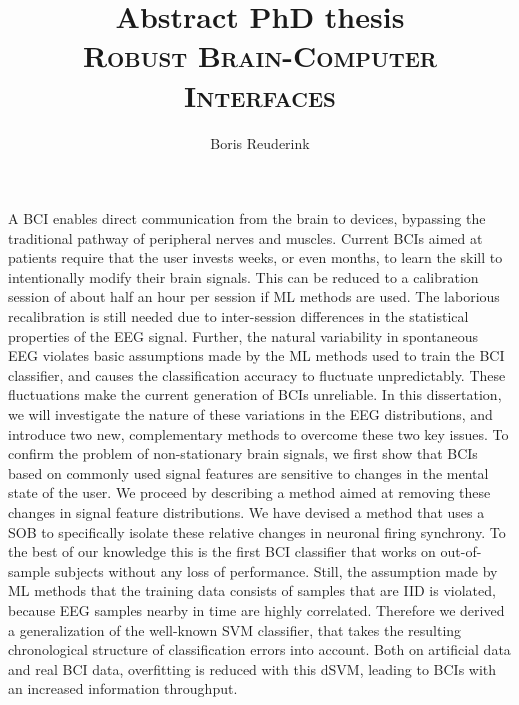 \documentclass[a4paper]{article}
\title{Abstract PhD thesis\\ \textsc{Robust Brain-Computer Interfaces}}
\author{Boris Reuderink}
\begin{document}
\maketitle

A \ac{BCI} enables direct communication from the brain to devices,
bypassing the traditional pathway of peripheral nerves and muscles.   
%
Current \acp{BCI} aimed at patients require that the user invests weeks, or even
months, to learn the skill to intentionally modify their brain signals. This can
be reduced to a calibration session of about half an hour per session if
\ac{ML} methods are used. The laborious recalibration is still needed due to
inter-session differences in the statistical properties of the \ac{EEG} signal.
%
Further, the natural variability in spontaneous \ac{EEG} violates basic
assumptions made by the \ac{ML} methods used to train the \ac{BCI} classifier,
and causes the classification accuracy to fluctuate unpredictably. These
fluctuations make the current generation of \acp{BCI} unreliable.
%
In this dissertation, we will investigate the nature of these variations in the
\ac{EEG} distributions, and introduce two new, complementary methods to
overcome these two key issues.
%
To confirm the problem of non-stationary brain signals, we first show that
\acp{BCI} based on commonly used signal features are sensitive to changes in
the mental state of the user.
% 
We proceed by describing a method aimed at removing these changes in signal
feature distributions. We have devised a method that uses a \ac{SOB} to
specifically isolate these relative changes in neuronal firing synchrony. To
the best of our knowledge this is the first \ac{BCI} classifier that works on
out-of-sample subjects without any loss of performance.
%
Still, the assumption made by \ac{ML} methods that the training data consists of
samples that are \ac{IID} is violated, because \ac{EEG} samples nearby in time
are highly correlated. Therefore we derived a generalization of the well-known
\ac{SVM} classifier, that takes the resulting chronological structure of
classification errors into account. Both on artificial data and real \ac{BCI}
data, overfitting is reduced with this \ac{dSVM}, leading to \acp{BCI} with an
increased information throughput.

\end{document}
